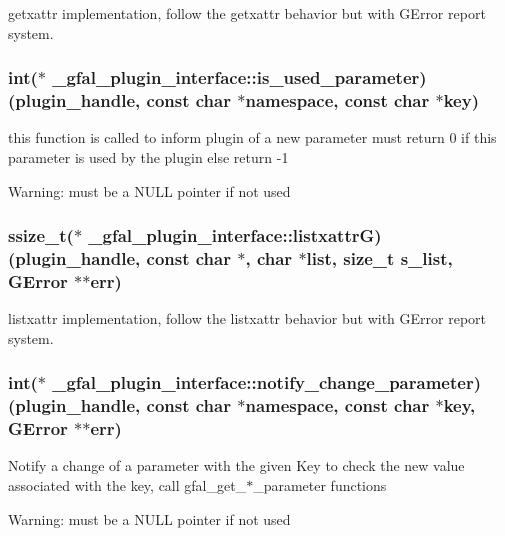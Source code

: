 getxattr implementation, follow the getxattr behavior but with GError report system. 
\subsubsection{\setlength{\rightskip}{0pt plus 5cm}int($\ast$ \bf{\_\-gfal\_\-plugin\_\-interface::is\_\-used\_\-parameter})(plugin\_\-handle, const char $\ast$namespace, const char $\ast$key)}\label{struct__gfal__plugin__interface_ec669e59c0089062136f1c213bf95bd0}


this function is called to inform plugin of a new parameter must return 0 if this parameter is used by the plugin else return -1 \begin{Desc}
\item[Warning:]must be a NULL pointer if not used \end{Desc}
\subsubsection{\setlength{\rightskip}{0pt plus 5cm}ssize\_\-t($\ast$ \bf{\_\-gfal\_\-plugin\_\-interface::listxattr\-G})(plugin\_\-handle, const char $\ast$, char $\ast$list, size\_\-t s\_\-list, GError $\ast$$\ast$err)}\label{struct__gfal__plugin__interface_c3bae2e54ce8998722f03b588d423b18}


listxattr implementation, follow the listxattr behavior but with GError report system. 
\subsubsection{\setlength{\rightskip}{0pt plus 5cm}int($\ast$ \bf{\_\-gfal\_\-plugin\_\-interface::notify\_\-change\_\-parameter})(plugin\_\-handle, const char $\ast$namespace, const char $\ast$key, GError $\ast$$\ast$err)}\label{struct__gfal__plugin__interface_e0602ea71c149e21090912c6ac1b556f}


Notify a change of a parameter with the given Key to check the new value associated with the key, call gfal\_\-get\_\-$\ast$\_\-parameter functions \begin{Desc}
\item[Warning:]must be a NULL pointer if not used \end{Desc}
